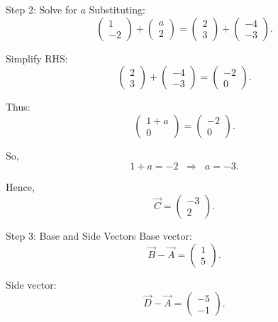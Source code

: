 \documentclass{beamer}
\begin{document}
\begin{frame}{Step 2: Solve for $a$}
Substituting:
\begin{equation}
\begin{pmatrix}1\\-2\end{pmatrix}+\begin{pmatrix}a\\2\end{pmatrix}
=\begin{pmatrix}2\\3\end{pmatrix}+\begin{pmatrix}-4\\-3\end{pmatrix}.
\end{equation}

Simplify RHS:
\begin{equation}
\begin{pmatrix}2\\3\end{pmatrix}+\begin{pmatrix}-4\\-3\end{pmatrix}
=\begin{pmatrix}-2\\0\end{pmatrix}.
\end{equation}

Thus:
\begin{equation}
\begin{pmatrix}1+a\\0\end{pmatrix}=\begin{pmatrix}-2\\0\end{pmatrix}.
\end{equation}

So,
\begin{equation}
1+a=-2 \;\;\Longrightarrow\;\; a=-3.
\end{equation}

Hence,
\begin{equation}
\vec C=\begin{pmatrix}-3\\2\end{pmatrix}.
\end{equation}
\end{frame}

\begin{frame}{Step 3: Base and Side Vectors}
Base vector:
\begin{equation}
\vec B-\vec A=\begin{pmatrix}1\\5\end{pmatrix}.
\end{equation}

Side vector:
\begin{equation}
\vec D-\vec A=\begin{pmatrix}-5\\-1\end{pmatrix}.
\end{equation}
\end{frame}
\end{document}
